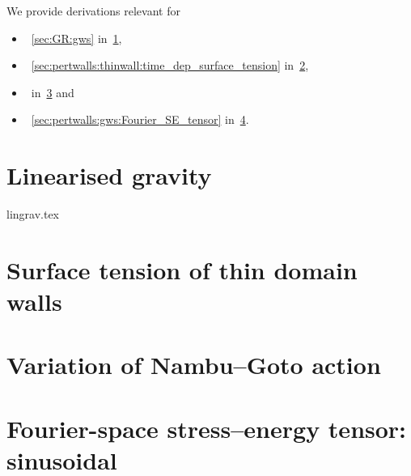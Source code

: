 





We provide derivations relevant for
\begin{itemize}
    \item~\cref{sec:GR:gws} in~\cref{app:derivations:gws},
    \item~\cref{sec:pertwalls:thinwall:time_dep_surface_tension} in~\cref{app:derivations:surface_tension},
    \item~\blahblah in~\cref{app:derivations:NG_action} and
    \item~\cref{sec:pertwalls:gws:Fourier_SE_tensor} in~\cref{app:walls:SE_tensor:FT_SE}.
\end{itemize}



\section{Linearised gravity}\label{app:derivations:gws}
    {{lingrav.tex}}


\section{Surface tension of thin domain walls}\label{app:derivations:surface_tension}


    
\section{Variation of Nambu--Goto action}\label{app:derivations:NG_action}

    


\section{Fourier-space stress--energy tensor: sinusoidal}\label{app:walls:SE_tensor:FT_SE}



